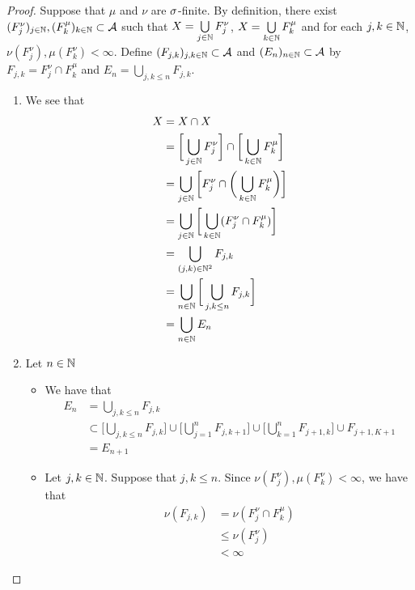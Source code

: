 \documentclass{book}
\begin{document}
	\begin{proof}
		Suppose that $\mu$ and $\nu$ are $\sigma$-finite. By definition, there exist $(F^{\nu}_j)_{j \in \mathbb{N}}, (F^{\mu}_k)_{k \in \mathbb{N}} \subset \mathcal{A}$ such that $X = \bigcup\limits_{j \in \mathbb{N}} F^{\nu}_j$, $X = \bigcup\limits_{k \in \mathbb{N}} F^{\mu}_k$ and for each $j,k \in \mathbb{N}$, $\nu(F^{\nu}_j), \mu(F^{\nu}_k) < \infty$. Define $(F_{j,k})_{j,k \in \mathbb{N}} \subset \mathcal{A}$ and $(E_n)_{n \in \mathbb{N}} \subset \mathcal{A}$ by $F_{j,k} = F^{\nu}_j \cap F^{\mu}_k$ and $E_n = \bigcup\limits_{j,k \leq n} F_{j, k}$.
		\begin{enumerate}
			\item We see that 
			\begin{align*}
				X
				& = X \cap X \\
				& = \bigg[ \bigcup_{j \in \mathbb{N}} F^{\nu}_j \bigg] \cap \bigg[ \bigcup_{k \in \mathbb{N}} F^{\mu}_k \bigg] \\
				& = \bigcup_{j \in \mathbb{N}} \bigg[ F^{\nu}_j  \cap \bigg( \bigcup_{k \in \mathbb{N}} F^{\mu}_k \bigg) \bigg] \\
				& = \bigcup_{j \in \mathbb{N}} \bigg[ \bigcup_{k \in \mathbb{N}} (F^{\nu}_j  \cap F^{\mu}_k) \bigg] \\
				& = \bigcup_{(j,k) \in \mathbb{N}^2} F_{j,k} \\
				& = \bigcup_{n \in \mathbb{N}} \bigg[  \bigcup\limits_{j,k \leq n} F_{j, k} \bigg] \\
				& = \bigcup_{n \in \mathbb{N}} E_n
			\end{align*}
			\item Let $n \in \mathbb{N}$
			\begin{itemize}
				\item We have that  
				\begin{align*}
					E_n
					& =  \bigcup\limits_{j,k \leq n} F_{j, k} \\
					& \subset \bigg[  \bigcup\limits_{j,k \leq n} F_{j, k}  \bigg] \cup \bigg[  \bigcup\limits_{j =1}^n F_{j, k+1} \bigg] \cup \bigg[  \bigcup\limits_{k =1}^n F_{j+1, k} \bigg] \cup F_{j+1, K+1} \\
					& = E_{n+1} 
				\end{align*}
				\item Let $j,k \in \mathbb{N}$. Suppose that $j,k \leq n$. Since $\nu(F^{\nu}_j), \mu(F^{\nu}_k) < \infty$, we have that 
				\begin{align*}
					\nu(F_{j,k})
					& = \nu( F^{\nu}_j  \cap F^{\mu}_k ) \\
					& \leq \nu(F^{\nu}_j) \\
					& < \infty 
				\end{align*}

\end{itemize}
\end{enumerate}
\end{proof}
\end{document}
